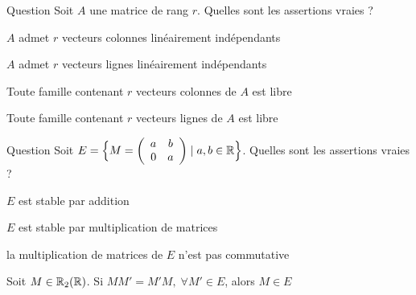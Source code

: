 \begin{multi}[multiple,feedback=
{Le rang d'une matrice est le nombre maximum de vecteurs colonnes ou  lignes qui sont linéairement indépendants.
}]{Question}
Soit \(A\) une matrice de rang \(r\). Quelles sont les assertions vraies ?

    \item* \(A\) admet \(r\) vecteurs colonnes linéairement indépendants
    \item* \(A\) admet \(r\) vecteurs lignes linéairement indépendants
    \item Toute famille contenant \(r\) vecteurs colonnes de \(A\) est libre
    \item Toute famille contenant \(r\) vecteurs lignes de \(A\) est libre
\end{multi}


\begin{multi}[multiple,feedback=
{On vérifie que \(E\) est stable par addition et par multiplication de matrices et que la multiplication de matrices de \(E\) est commutative.
\vskip0mm
Soit \(M \in \Rr_2(\Rr)\). On vérifie que si \(MM'=M'M,\) pour toute matrice \(M'\) de \( E\), alors \(M\in E\).
}]{Question}
Soit \(E=\Big\{M = \left(\begin{array}{rc}a&b\\
0&a\end{array}\right)\mid a,b\in\mathbb{R} \Big\}\). Quelles sont les assertions vraies ?

    \item* \(E\) est stable par addition
    \item* \(E\) est stable par multiplication de matrices
    \item la multiplication de matrices de \(E\) n'est pas commutative
    \item* Soit \(M \in \Rr_2(\Rr)\). Si \(MM'=M'M, \; \forall M' \in E\), alors \(M\in E\)
\end{multi}



